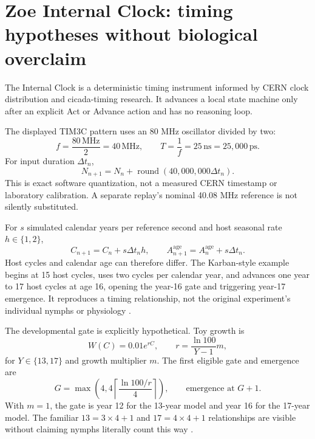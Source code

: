 \section{Zoe Internal Clock: timing hypotheses without biological overclaim}
The Internal Clock is a deterministic timing instrument informed by CERN clock distribution and cicada-timing research. It advances a local state machine only after an explicit Act or Advance action and has no reasoning loop.

The displayed TIM3C pattern uses an 80 MHz oscillator divided by two:
\begin{equation}
f=\frac{80\,\mathrm{MHz}}{2}=40\,\mathrm{MHz},\qquad
T=\frac1f=25\,\mathrm{ns}=25{,}000\,\mathrm{ps}.
\end{equation}
For input duration $\Delta t_n$,
\begin{equation}
N_{n+1}=N_n+\operatorname{round}(40{,}000{,}000\Delta t_n).
\end{equation}
This is exact software quantization, not a measured CERN timestamp or laboratory calibration. A separate replay's nominal 40.08 MHz reference is not silently substituted.

For $s$ simulated calendar years per reference second and host seasonal rate $h\in\{1,2\}$,
\begin{equation}
C_{n+1}=C_n+s\Delta t_nh,\qquad
A^{\mathrm{age}}_{n+1}=A^{\mathrm{age}}_n+s\Delta t_n.
\end{equation}
Host cycles and calendar age can therefore differ. The Karban-style example begins at 15 host cycles, uses two cycles per calendar year, and advances one year to 17 host cycles at age 16, opening the year-16 gate and triggering year-17 emergence. It reproduces a timing relationship, not the original experiment's individual nymphs or physiology \cite{karban2000}.

The developmental gate is explicitly hypothetical. Toy growth is
\begin{equation}
W(C)=0.01e^{rC},\qquad r=\frac{\ln100}{Y-1}m,
\end{equation}
for $Y\in\{13,17\}$ and growth multiplier $m$. The first eligible gate and emergence are
\begin{equation}
G=\max\!\left(4,4\left\lceil\frac{\ln100/r}{4}\right\rceil\right),
\qquad \text{emergence at }G+1.
\end{equation}
With $m=1$, the gate is year 12 for the 13-year model and year 16 for the 17-year model. The familiar $13=3\times4+1$ and $17=4\times4+1$ relationships are visible without claiming nymphs literally count this way \cite{yoshimura2022}.

